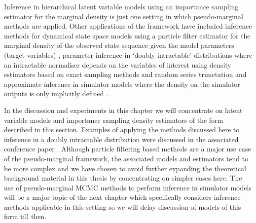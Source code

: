 Inference in hierarchical latent variable models using an importance sampling estimator for the marginal density is just one setting in which pseudo-marginal methods are applied. Other applications of the framework have included inference methods for dynamical state space models using a particle filter estimator \citep{doucet2001sequential,gordon1993novel} for the marginal density of the observed state sequence given the model parameters (target variables) \citep{pitt2010auxiliary,chopin2015particle,andrieu2010particle}, parameter inference in `doubly-intractable' distributions \citep{murray2006mcmc} where an intractable normaliser depends on the variables of interest using density estimators based on exact sampling methods \citep{propp1996exact,moller2006efficient,murray2007advances} and random series trunctation \citep{lyne2015russian} and approximate inference in simulator models where the density on the simulator outputs is only implicitly defined \citep{marjoram2003markov}. 

In the discussion and experiments in this chapter we will concentrate on latent variable models and importance sampling density estimators of the form described in this section. Examples of applying the methods discussed here to inference in a doubly intractable distribution were discussed in the associated conference paper \citep{murray2016pseudo}. Although particle filtering based methods are a major use case of the pseudo-marginal framework, the associated models and estimators tend to be more complex and we have chosen to avoid further expanding the theoretical background material in this thesis by concentrating on simpler cases here. The use of pseudo-marginal \ac{MCMC} methods to perform inference in simulator models will be a major topic of the next chapter which specifically considers inference methods applicable in this setting so we will delay discussion of models of this form till then.

